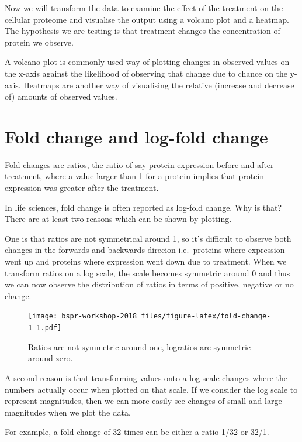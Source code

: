 \documentclass[12pt,]{book}
\begin{document}
Now we will transform the data to examine the effect of
the treatment on the cellular proteome and visualise the output using a volcano
plot and a heatmap. The hypothesis we are testing is that treatment
changes the concentration of protein we observe.

A volcano plot is commonly used way of plotting changes in observed values
on the x-axis against the likelihood of observing that change due to chance
on the y-axis. Heatmaps are another way of visualising the relative
(increase and decrease of) amounts of observed values.

\hypertarget{fold-change-and-log-fold-change}{%
\section{Fold change and log-fold change}\label{fold-change-and-log-fold-change}}

Fold changes are ratios, the ratio of say protein expression before and
after treatment, where a value larger than 1 for a protein implies that
protein expression was greater after the treatment.

In life sciences, fold change is often reported as log-fold change. Why is that?
There are at least two reasons which can be shown by plotting.

One is that ratios are not symmetrical around 1, so it's difficult to observe
both changes in the forwards and backwards direcion i.e.~proteins where expression
went up and proteins where expression went down due to treatment. When we
transform ratios on a log scale, the scale becomes symmetric around 0 and thus
we can now observe the distribution of ratios in terms of positive, negative or
no change.



\begin{figure}
\centering
\texttt{[image: bspr-workshop-2018\_files/figure-latex/fold-change-1-1.pdf]}
\caption{\label{fig:fold-change-1}Ratios are not symmetric around one, logratios are symmetric around zero.}
\end{figure}

A second reason is that transforming values onto a log scale changes where
the numbers actually occur when plotted on that scale. If we consider the log
scale to represent magnitudes, then we can more easily see changes of small and
large magnitudes when we plot the data.

For example, a fold change of 32 times can be either a ratio 1/32 or 32/1.
\end{document}
